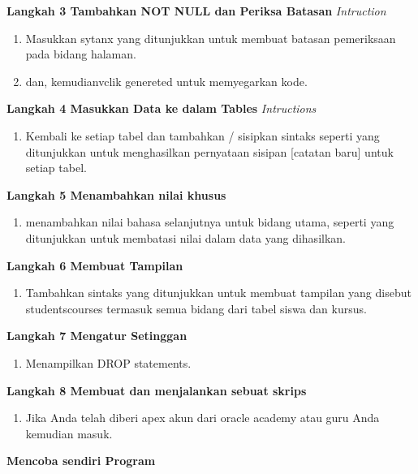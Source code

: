 \documentclass [12pt, times new roman, a4paper]{article}
\begin{document}
\textbf{Langkah 3 Tambahkan NOT NULL dan Periksa Batasan}
\textit{Intruction}
\begin{enumerate}
    \item Masukkan sytanx yang ditunjukkan untuk membuat batasan pemeriksaan pada bidang halaman.
    \item dan, kemudianvclik genereted untuk memyegarkan kode.
\end{enumerate}
\textbf{Langkah 4 Masukkan Data ke dalam Tables}
\textit{Intructions}
\begin{enumerate}
    \item Kembali ke setiap tabel dan tambahkan / sisipkan sintaks seperti yang ditunjukkan untuk menghasilkan pernyataan sisipan [catatan baru] untuk setiap tabel.
\end{enumerate}
\textbf{Langkah 5 Menambahkan nilai khusus}
\begin{enumerate}
    \item menambahkan nilai bahasa selanjutnya untuk bidang utama, seperti yang ditunjukkan untuk membatasi nilai dalam data yang dihasilkan.
\end{enumerate}
\textbf{Langkah 6 Membuat Tampilan}
\begin{enumerate}
    \item Tambahkan sintaks yang ditunjukkan untuk membuat tampilan yang disebut studentscourses termasuk semua bidang dari tabel siswa dan kursus.
\end{enumerate}
\textbf{Langkah 7 Mengatur Setinggan}
\begin{enumerate}
    \item Menampilkan DROP statements.
\end{enumerate}
\textbf{Langkah 8 Membuat dan menjalankan sebuat skrips}
\begin{enumerate}
    \item Jika Anda telah diberi apex akun dari oracle academy atau guru Anda kemudian masuk.
\end{enumerate}
\textbf{Mencoba sendiri Program}
\end{document}
